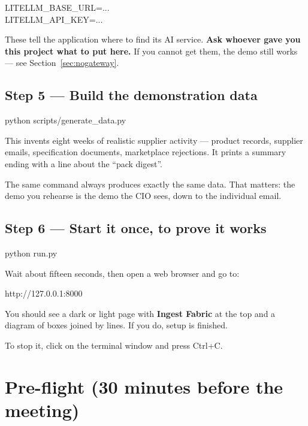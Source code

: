 \documentclass[11pt,a4paper]{article}
\newcommand{\ui}[1]{\textbf{#1}}          %
\newcommand{\key}[1]{\textsf{\small #1}}  %
\begin{document}
\begin{cmd}
LITELLM\_BASE\_URL=...\\
LITELLM\_API\_KEY=...
\end{cmd}

These tell the application where to find its AI service. \textbf{Ask whoever
gave you this project what to put here.} If you cannot get them, the demo still
works --- see Section~\ref{sec:nogateway}.

\subsection{Step 5 --- Build the demonstration data}

\begin{cmd}
python scripts/generate\_data.py
\end{cmd}

This invents eight weeks of realistic supplier activity --- product records,
supplier emails, specification documents, marketplace rejections. It prints a
summary ending with a line about the ``pack digest''.

\begin{aside}
The same command always produces exactly the same data. That matters: the demo
you rehearse is the demo the CIO sees, down to the individual email.
\end{aside}

\subsection{Step 6 --- Start it once, to prove it works}

\begin{cmd}
python run.py
\end{cmd}

Wait about fifteen seconds, then open a web browser and go to:

\begin{cmd}
http://127.0.0.1:8000
\end{cmd}

You should see a dark or light page with \ui{Ingest Fabric} at the top and a
diagram of boxes joined by lines. If you do, setup is finished.

To stop it, click on the terminal window and press \key{Ctrl}+\key{C}.

\section{Pre-flight (30 minutes before the meeting)}
\label{sec:preflight}
\end{document}
